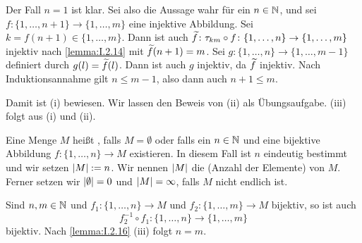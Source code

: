 \begin{beweis}
	Der Fall $n=1$ ist klar.
	Sei also die Aussage wahr für ein $n \in \mathbb{N}$, und sei $f\colon \{1, \dots, n+1\} \rightarrow \{1,\dots,m\}$ eine injektive Abbildung.
	Sei $k = f(n+1) \in \{1,\dots,m\}$.
	Dann ist auch $\widetilde{f}\colon \tau_{km} \circ f \colon \{1,\dots,n\} \rightarrow \{1,\dots,m\}$ injektiv nach \autoref{lemma:I.2.14} mit $\widetilde{f}(n+1)=m$.
	Sei $g \colon \{1,\dots,n\} \rightarrow \{1,\dots,m-1\}$ definiert durch $g(l) = \widetilde{f}(l)$.
	Dann ist auch $g$ injektiv, da $\widetilde{f}$ injektiv.
	Nach Induktionsannahme gilt $n \leq m-1$, also dann auch $n+1 \leq m$.
	
	Damit ist (i) bewiesen.
	Wir lassen den Beweis von (ii) als Übungsaufgabe.
	(iii) folgt aus (i) und (ii). \qedhere
\end{beweis}

\begin{definition}
	\label{def:I.2.17}
	Eine Menge $M$ heißt , falls $M = \emptyset$ oder falls ein $n \in \mathbb{N}$ und eine bijektive Abbildung $f \colon \{1,\dots,n\} \rightarrow M$ existieren.
	In diesem Fall ist $n$ eindeutig bestimmt und wir setzen $\lvert M\rvert := n$.
	Wir nennen $\lvert M\rvert$ die  (Anzahl der Elemente) von $M$.
	Ferner setzen wir $\lvert\emptyset\rvert = 0$ und $\lvert M\rvert = \infty$, falls $M$ nicht endlich ist.
\end{definition}

\begin{beweis}
	Sind $n,m \in \mathbb{N}$ und $f_1\colon \{1,\dots,n\} \rightarrow M$ und $f_2 \colon \{1,\dots,m\} \rightarrow M$ bijektiv, so ist auch
	\[
		f_2^{-1} \circ f_1 \colon \{1,\dots,n\} \rightarrow \{1,\dots,m\}
	\]
	bijektiv.
	Nach \autoref{lemma:I.2.16} (iii) folgt $n = m$. \qedhere
\end{beweis} 
\newpage